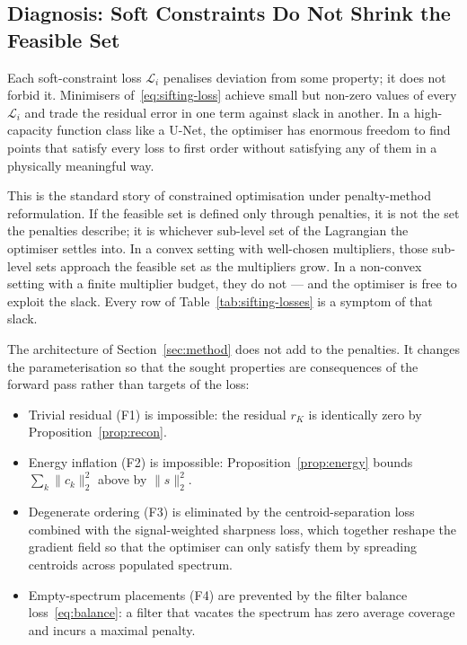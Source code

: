 \documentclass[journal]{IEEEtran}
\theoremstyle{remark}
\begin{document}
\subsection{Diagnosis: Soft Constraints Do Not Shrink the Feasible Set}
\label{subsec:diagnosis}

Each soft-constraint loss $\mathcal{L}_{i}$ penalises deviation from
some property; it does not forbid it. Minimisers of~\eqref{eq:sifting-loss}
achieve small but non-zero values of every $\mathcal{L}_{i}$ and trade
the residual error in one term against slack in another. In a
high-capacity function class like a U-Net, the optimiser has enormous
freedom to find points that satisfy every loss to first order without
satisfying any of them in a physically meaningful way.

This is the standard story of constrained optimisation under
penalty-method reformulation. If the feasible set is defined only
through penalties, it is not the set the penalties describe; it is
whichever sub-level set of the Lagrangian the optimiser settles into.
In a convex setting with well-chosen multipliers, those sub-level sets
approach the feasible set as the multipliers grow. In a non-convex
setting with a finite multiplier budget, they do not --- and the
optimiser is free to exploit the slack. Every row of
Table~\ref{tab:sifting-losses} is a symptom of that slack.

The architecture of Section~\ref{sec:method} does not add to the
penalties. It changes the parameterisation so that the sought
properties are consequences of the forward pass rather than targets of
the loss:
\begin{itemize}
\item Trivial residual (F1) is impossible: the residual $r_{K}$ is
  identically zero by Proposition~\ref{prop:recon}.
\item Energy inflation (F2) is impossible:
  Proposition~\ref{prop:energy} bounds $\sum_{k}\|c_{k}\|_{2}^{2}$
  above by $\|s\|_{2}^{2}$.
\item Degenerate ordering (F3) is eliminated by the
  centroid-separation loss combined with the signal-weighted sharpness
  loss, which together reshape the gradient field so that the
  optimiser can only satisfy them by spreading centroids across
  populated spectrum.
\item Empty-spectrum placements (F4) are prevented by the filter
  balance loss~\eqref{eq:balance}: a filter that vacates the spectrum
  has zero average coverage and incurs a maximal penalty.
\end{itemize}
\end{document}
